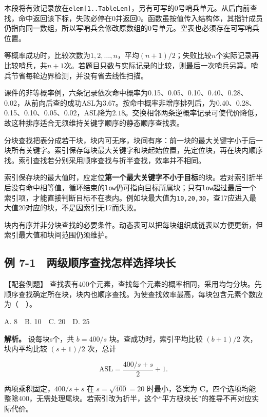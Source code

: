 本段将有效记录放在\texttt{elem[\allowbreak{}1.\allowbreak{}.\allowbreak{}TableLen]\allowbreak{}}，另有可写的0号哨兵单元。从后向前查找，命中返回该下标，失败必停在0并返回0。函数虽按值传入结构体，其指针成员仍指向同一数组，所以写哨兵会修改原数组的0号单元。空表也必须存在可写哨兵位置。

等概率成功时，比较次数为\(1,2,\ldots,n\)，平均\((n+1)/2\)；失败比较\(n\)个实际记录再比较哨兵，共\(n+1\)次。若题目只数与实际记录的比较，则最后一次哨兵另算。哨兵节省每轮边界检测，并没有省去线性扫描。

课件的非等概率例，六条记录依次命中概率为0.15、0.05、0.10、0.40、0.28、0.02，从前向后查的成功ASL为\(3.67\)。按命中概率非增序排列后，为0.40、0.28、0.15、0.10、0.05、0.02，ASL降为\(2.18\)。交换相邻两条逆概率记录可使代价降低，故这种排序适合无须维持关键字顺序的静态顺序查找表。

分块查找把表分成若干块，块内可无序，块间有序：前一块的最大关键字小于后一块所有关键字。索引保存每块最大关键字和块起始位置，先定位块，再在块内顺序找。索引查找若分别采用顺序查找与折半查找，效率并不相同。

索引保存块的最大值时，应定位\textbf{第一个最大关键字不小于目标}的块。若对索引折半后没有命中相等值，循环结束的\texttt{low}仍可指向目标所属块；只有\texttt{low}超过最后一个索引项，才能直接判断目标不在表内。例如块最大值为\texttt{10,\allowbreak{}20,\allowbreak{}30}，查17应进入最大值20对应的块，不是因索引无17而失败。

块内有序并非分块查找的必要条件。动态表可以把每块组织成链表以方便更新，但索引最大值和块间范围仍须维护。

\subsection{例 7-1　两级顺序查找怎样选择块长}\label{DS07-ex1}

\begin{example}[配套案例]

【配套例题】 查找表有400个元素，查找每个元素的概率相同，采用均匀分块。先顺序查找确定所在块，块内也顺序查找。为使查找效率最高，每块包含元素个数应为（　）。

A. 8　B. 10　C. 20　D. 25

\end{example}

\textbf{解析。} 设每块s个，共 \(b=400/s\) 块。查成功时，索引平均比较 \((b+1)/2\) 次，块内平均比较 \((s+1)/2\) 次，总计

\[\mathrm{ASL}=\frac{400/s+s}{2}+1.\]

两项乘积固定，\(400/s+s\) 在 \(s=\sqrt{400}=20\) 时最小，答案为 \textbf{C}。四个选项均能整除400，无需处理尾块。若索引改为折半，这个``平方根块长''的推导不再对应实际代价。

